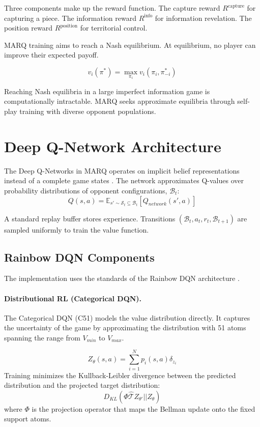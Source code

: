Three components make up the reward function. The capture reward $R^{\text{capture}}$ for capturing a piece. The information reward $R^{\text{info}}$ for information revelation. The position reward $R^{\text{position}}$ for territorial control.

MARQ training aims to reach a Nash equilibrium. At equilibrium, no player can improve their expected payoff.

\begin{equation}
v_i(\pi^*) = \max_{\pi_i} v_i(\pi_i, \pi^*_{-i})
\end{equation}

Reaching Nash equilibria in a large imperfect information game is computationally intractable. MARQ seeks approximate equilibria through self-play training with diverse opponent populations.


\section{Deep Q-Network Architecture}

The Deep Q-Networks in MARQ operates on implicit belief representations instead of a complete game states \cite{DRLImperfectInfo2023}. The network approximates Q-values over probability distributions of opponent configurations, $\mathcal{B}_t$:
$$Q(s, a) = \mathbb{E}_{s' \sim \mathcal{S}_t \subseteq \mathcal{B}_t}[Q_{network}(s', a)]$$

A standard replay buffer stores experience. Transitions $(\mathcal{B}_t, a_t, r_t, \mathcal{B}_{t+1})$ are sampled uniformly to train the value function.

\subsection{Rainbow DQN Components}
The implementation uses the standards of the Rainbow DQN architecture \cite{RainbowJMLR2021}.

\paragraph{Distributional RL (Categorical DQN).}
The Categorical DQN (C51) \cite{DistributionalRL2023} models the value distribution directly. It captures the uncertainty of the game by approximating the distribution with 51 atoms spanning the range from $V_{min}$ to $V_{max}$.

\begin{equation}
Z_\theta(s, a) = \sum_{i=1}^{N} p_i(s, a) \delta_{z_i}
\end{equation}
Training minimizes the Kullback-Leibler divergence between the predicted distribution and the projected target distribution:
\begin{equation}
D_{KL}(\Phi \hat{\mathcal{T}} Z_{\theta'} || Z_\theta)
\end{equation}
where $\Phi$ is the projection operator that maps the Bellman update onto the fixed support atoms.

